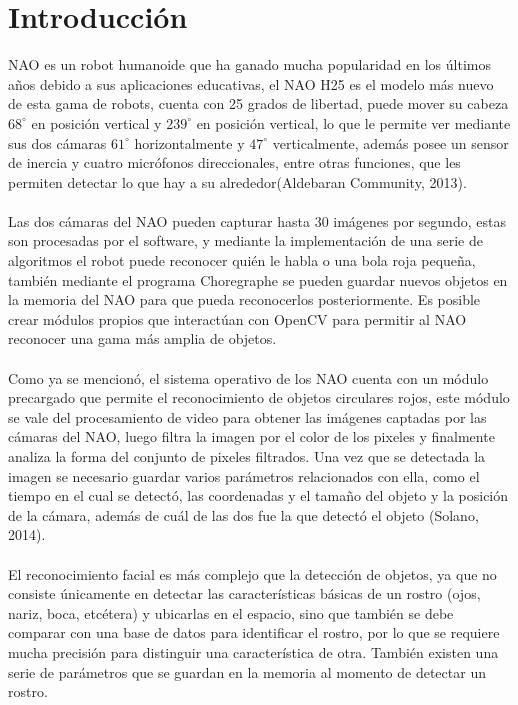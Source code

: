 \documentclass[letterpaper]{article}
\begin{document}
\section{Introducción}
NAO es un robot humanoide que ha ganado mucha popularidad en los últimos años debido a sus aplicaciones educativas, el NAO H25 es el modelo más nuevo de esta gama de robots, cuenta con 25 grados de libertad, puede mover su cabeza $68^{\circ}$ en posición vertical y $239^{\circ}$ en posición vertical, lo que le permite ver mediante sus dos cámaras $61^{\circ}$ horizontalmente y $47^{\circ}$ verticalmente, además posee un sensor de inercia y cuatro micrófonos direccionales, entre otras funciones, que les permiten detectar lo que hay a su alrededor(Aldebaran Community, 2013).\\\\
Las dos cámaras del NAO pueden capturar hasta 30 imágenes por segundo, estas son procesadas por el software, y mediante la implementación de una serie de algoritmos el robot puede reconocer quién le habla o una bola roja pequeña, también mediante el programa Choregraphe se pueden guardar nuevos objetos en la memoria del NAO para que pueda reconocerlos posteriormente. Es posible crear módulos propios que interactúan con OpenCV para permitir al NAO reconocer una gama más amplia de objetos.\\\\
Como ya se mencionó, el sistema operativo de los NAO cuenta con un módulo precargado que permite el reconocimiento de objetos circulares rojos, este módulo se vale del procesamiento de video para obtener las imágenes captadas por las cámaras del NAO, luego filtra la imagen por el color de los pixeles y finalmente analiza la forma del conjunto de pixeles filtrados. Una vez que se detectada la imagen se necesario guardar varios parámetros relacionados con ella, como el tiempo en el cual se detectó, las coordenadas y el tamaño del objeto y la posición de la cámara, además de cuál de las dos fue la que detectó el objeto (Solano, 2014).\\\\
El reconocimiento facial es más complejo que la detección de objetos, ya que no consiste únicamente en detectar las características básicas de un rostro (ojos, nariz, boca, etcétera) y ubicarlas en el espacio, sino que también se debe comparar con una base de datos para identificar el rostro, por lo que se requiere mucha precisión para distinguir una característica de otra. También existen una serie de parámetros que se guardan en la memoria al momento de detectar un rostro.\\\\
\end{document}
